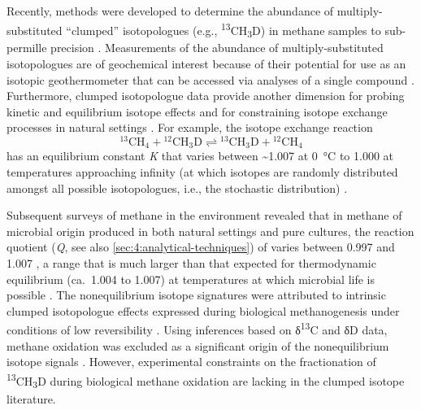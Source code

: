 Recently, methods were developed to determine the abundance of
multiply-substituted ``clumped'' isotopologues (e.g.,
\textsuperscript{13}CH\textsubscript{3}D) in methane samples to
sub-permille precision \parencite{Ono++_2014_AC,Stolper++_2014_GCA,Young++_2016_IJMS}. Measurements of the abundance of multiply-substituted
isotopologues are of geochemical interest because of their potential for
use as an isotopic geothermometer that can be accessed via analyses of a
single compound \parencite{Wang++_2004_GCA,Eiler_2007_EPSL}. Furthermore, clumped
isotopologue data provide another dimension for probing kinetic and
equilibrium isotope effects and for constraining isotope exchange
processes in natural settings \parencite[e.g.,][]{Eiler+Schauble_2004_GCA,Yeung++_2012_JGR,Yeung_2016_GCA}. For example, the isotope exchange reaction
\begin{equation}\label{eqn:4:2}
{}^{13}\text{CH}_4+ {}^{12}{\text{CH}}_3\text{D}\rightleftharpoons {}^{13}{\text{CH}}_3\text{D}+ {}^{12}{\text{CH}}_4
\end{equation}
has an equilibrium constant \emph{K} that varies between
\textasciitilde{}1.007 at 0~°C to 1.000 at temperatures approaching
infinity (at which isotopes are randomly distributed amongst all
possible isotopologues, i.e., the stochastic distribution) \parencite[see][and references therein for details regarding calculations from which \emph{K} is obtained]{Wang++_2015_S}.

Subsequent surveys of methane in the environment revealed that in
methane of microbial origin produced in both natural settings and pure
cultures, the reaction quotient (\emph{Q}, see also \autoref{sec:4:analytical-techniques}) of
 varies between 0.997 and 1.007 \parencite{Stolper++_2014_S,Inagaki++_2015_S,Stolper++_2015_GCA,Wang++_2015_S,Douglas++_2016_GCA}, a range that is much larger than that expected for
thermodynamic equilibrium (ca.\ 1.004 to 1.007) at temperatures at which
microbial life is possible \parencite[\textasciitilde{}0 to 120~°C;][]{Takai++_2008_PNAS} \parencite{Wang++_2015_S}. The nonequilibrium isotope signatures were
attributed to intrinsic clumped isotopologue effects expressed during
biological methanogenesis under conditions of low reversibility \parencite{Stolper++_2015_GCA,Wang++_2015_S}. Using inferences based on
δ\textsuperscript{13}C and δD data, methane oxidation was excluded as a
significant origin of the nonequilibrium isotope signals \parencite{Wang++_2015_S}. However, experimental constraints on the fractionation of
\textsuperscript{13}CH\textsubscript{3}D during biological methane
oxidation are lacking in the clumped isotope literature.

